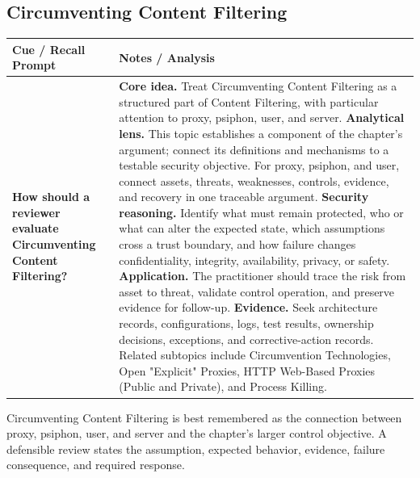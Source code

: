 \documentclass[11pt]{article}
\newcommand{\CornellHeader}{%
\rowcolor{Navy}\color{white}\bfseries Cue / Recall Prompt & \color{white}\bfseries Notes / Analysis\\\hline}
\newcommand{\CornellRow}[2]{%
\cellcolor{CueGray}\RaggedRight\textbf{#1} & \RaggedRight #2\\\hline}
\begin{document}
\subsection*{Circumventing Content Filtering}
\begin{longtable}{>{\RaggedRight\arraybackslash}p{}|>{\RaggedRight\arraybackslash}p{}}
\CornellHeader
\CornellRow{How should a reviewer evaluate Circumventing Content Filtering?}{\textbf{Core idea.} Treat Circumventing Content Filtering as a structured part of Content Filtering, with particular attention to proxy, psiphon, user, and server. \textbf{Analytical lens.} This topic establishes a component of the chapter's argument; connect its definitions and mechanisms to a testable security objective. For proxy, psiphon, and user, connect assets, threats, weaknesses, controls, evidence, and recovery in one traceable argument. \textbf{Security reasoning.} Identify what must remain protected, who or what can alter the expected state, which assumptions cross a trust boundary, and how failure changes confidentiality, integrity, availability, privacy, or safety. \textbf{Application.} The practitioner should trace the risk from asset to threat, validate control operation, and preserve evidence for follow-up. \textbf{Evidence.} Seek architecture records, configurations, logs, test results, ownership decisions, exceptions, and corrective-action records. Related subtopics include Circumvention Technologies, Open "Explicit" Proxies, HTTP Web-Based Proxies (Public and Private), and Process Killing.}
\end{longtable}
\begin{topicsummary}
Circumventing Content Filtering is best remembered as the connection between proxy, psiphon, user, and server and the chapter's larger control objective. A defensible review states the assumption, expected behavior, evidence, failure consequence, and required response.
\end{topicsummary}
\end{document}
